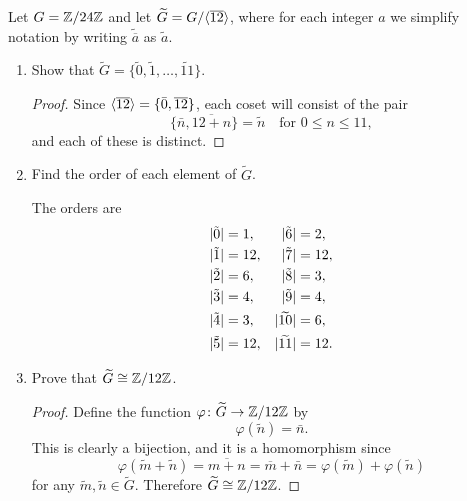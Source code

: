  Let $G = \mathbb{Z}/24\mathbb{Z}$ and let
$\widetilde{G} = G/\langle{\overline{12}}\rangle$, where for each integer $a$ we
simplify notation by writing $\widetilde{\overline{a}}$ as
$\tilde{a}$.
\begin{enumerate}
\item Show that
  $\widetilde{G} = \{\tilde0, \tilde1, \dots, \widetilde{11}\}$.
  \begin{proof}
    Since $\langle{\overline{12}}\rangle = \{\bar0, \overline{12}\}$, each coset
    will consist of the pair
    \begin{equation*}
      \{\bar{n}, \overline{12 + n}\} = \tilde{n}
      \quad\text{for $0\leq n\leq 11$},
    \end{equation*}
    and each of these is distinct.
  \end{proof}
\item Find the order of each element of $\widetilde{G}$.
  \begin{solution}
    The orders are
    \begin{align*}
      \lvert{\tilde0}\rvert &= 1,
      & \lvert{\tilde6}\rvert &= 2, \\
      \lvert{\tilde1}\rvert &= 12,
      & \lvert{\tilde7}\rvert &= 12, \\
      \lvert{\tilde2}\rvert &= 6,
      & \lvert{\tilde8}\rvert &= 3, \\
      \lvert{\tilde3}\rvert &= 4,
      & \lvert{\tilde9}\rvert &= 4, \\
      \lvert{\tilde4}\rvert &= 3,
      & \lvert{\widetilde{10}}\rvert &= 6, \\
      \lvert{\tilde5}\rvert &= 12,
      & \lvert{\widetilde{11}}\rvert &= 12. \qedhere
    \end{align*}
  \end{solution}
\item Prove that $\widetilde{G}\cong\mathbb{Z}/12\mathbb{Z}$.
  \begin{proof}
    Define the function $\varphi\colon\widetilde{G}\to\mathbb{Z}/12\mathbb{Z}$ by
    \begin{equation*}
      \varphi(\tilde{n}) = \bar{n}.
    \end{equation*}
    This is clearly a bijection, and it is a homomorphism since
    \begin{equation*}
      \varphi(\widetilde{m} + \tilde{n})
      = \overline{m + n}
      = \overline{m} + \bar{n}
      = \varphi(\widetilde{m}) + \varphi(\tilde{n})
    \end{equation*}
    for any $\widetilde{m},\tilde{n}\in\widetilde{G}$. Therefore
    $\widetilde{G}\cong\mathbb{Z}/12\mathbb{Z}$.
  \end{proof}
\end{enumerate}

